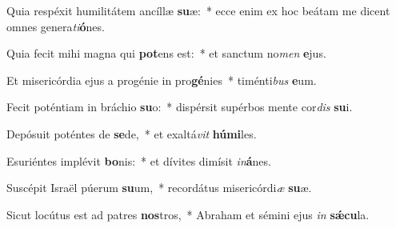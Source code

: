 \item Quia respéxit humilitátem ancíllæ \textbf{su}æ:~* ecce enim ex hoc beátam me dicent omnes genera\textit{ti}\textbf{ó}nes.
\item Quia fecit mihi magna qui \textbf{pot}ens est:~* et sanctum no\textit{men} \textbf{e}jus.
\item Et misericórdia ejus a progénie in pro\textbf{gé}nies~* timénti\textit{bus} \textbf{e}um.
\item Fecit poténtiam in bráchio \textbf{su}o:~* dispérsit supérbos mente cor\textit{dis} \textbf{su}i.
\item Depósuit poténtes de \textbf{se}de,~* et exaltá\textit{vit} \textbf{hú}\textbf{mi}les.
\item Esuriéntes implévit \textbf{bo}nis:~* et dívites dimísit \textit{in}\textbf{á}nes.
\item Suscépit Israël púerum \textbf{su}um,~* recordátus misericórdi\textit{æ} \textbf{su}æ.
\item Sicut locútus est ad patres \textbf{nos}tros,~* Abraham et sémini ejus \textit{in} \textbf{sǽ}\textbf{cu}la.
